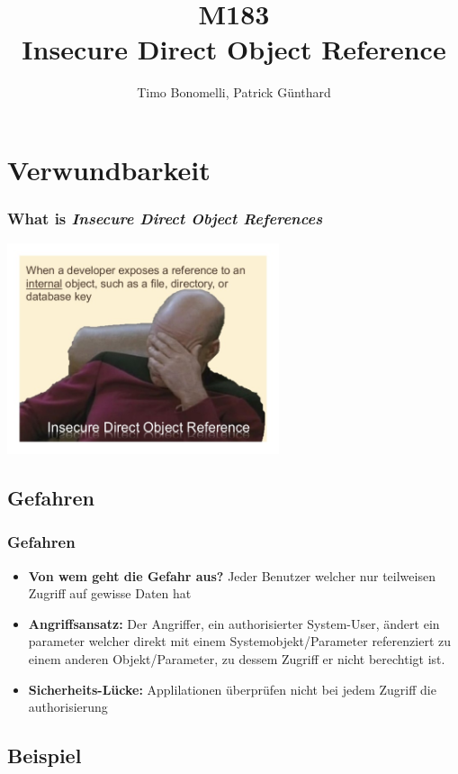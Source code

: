 \documentclass[aspectratio=169]{beamer}
\title{\textbf{M183} \\Insecure Direct Object Reference}
\author{Timo Bonomelli, Patrick Günthard}
\begin{document}
\frame{\titlepage}

\section{Verwundbarkeit}


\begin{frame}
  \frametitle{What is \textit{Insecure Direct Object References}}
  \includegraphics[width=8cm]{meme}
\end{frame}

\subsection{Gefahren}
 
\begin{frame}
  \frametitle{Gefahren}
  \begin{itemize}
  \item \textbf{Von wem geht die Gefahr aus?} Jeder Benutzer welcher nur teilweisen Zugriff auf gewisse Daten hat
  \item \textbf{Angriffsansatz:} Der Angriffer, ein authorisierter System-User, ändert ein parameter welcher direkt mit einem Systemobjekt/Parameter referenziert zu einem anderen Objekt/Parameter, zu dessem Zugriff er nicht berechtigt ist. 
  \item \textbf{Sicherheits-Lücke:} Applilationen überprüfen nicht bei jedem Zugriff die authorisierung
  \end{itemize}
\end{frame}

\subsection{Beispiel}
\end{document}
